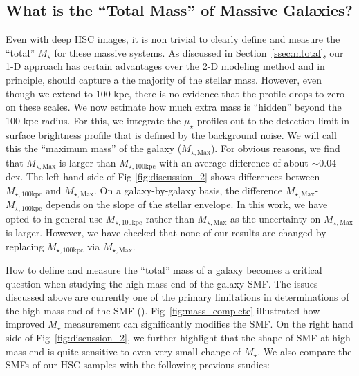 \documentclass[a4paper,fleqn,usenatbib]{mnras}
\def\mstar{{$M_{\star}$}}
\def\mtot{{$M_{\star,100\mathrm{kpc}}$}}
\def\mmax{{$M_{\star,\mathrm{Max}}$}}
\def\mden{{$\mu_{\star}$}}
\begin{document}
\subsection{What is the ``Total Mass'' of Massive Galaxies?}

    Even with deep HSC images, it is non trivial to clearly define and measure the
    ``total'' \mstar{} for these massive systems. 
    As discussed in Section~\ref{ssec:mtotal}, our 1-D approach has certain advantages 
    over the 2-D modeling method and in principle, should capture a the majority of 
    the stellar mass. 
    However, even though we extend to 100 kpc, there is no evidence that the profile 
    drops to zero on these scales. 
    We now estimate how much extra mass is ``hidden'' beyond the 100 kpc radius. 
    For this, we integrate the \mden{} profiles out to the detection limit in 
    surface brightness profile that is defined by the background noise.
    We will call this the ``maximum mass'' of the galaxy (\mmax{}). 
    For obvious reasons, we find that \mmax{} is larger than \mtot{} with an average 
    difference of about ${\sim}0.04$ dex. 
    The left hand side of Fig \ref{fig:discussion_2} shows differences between \mtot{}
    and \mmax{}. 
    On a galaxy-by-galaxy basis, the difference \mmax{}-\mtot{} depends on the slope 
    of the stellar envelope. 
    In this work, we have opted to in general use \mtot{} rather than \mmax{} as the 
    uncertainty on \mmax{} is larger. 
    However, we have checked that none of our results are changed by replacing \mtot{} 
    via \mmax{}.
        
    How to define and measure the ``total'' mass of a galaxy becomes a critical 
    question when studying the high-mass end of the galaxy SMF. 
    The issues discussed above are currently one of the primary limitations in 
    determinations of the high-mass end of the SMF (\citealt{Bernardi2016}). 
    Fig~\ref{fig:mass_complete} illustrated how improved \mstar{} measurement can 
    significantly modifies the SMF. 
    On the right hand side of Fig~\ref{fig:discussion_2}, we further highlight that 
    the shape of SMF at high-mass end is quite sensitive to even very small 
    change of \mstar{}. 
    We also compare the SMFs of our HSC samples with the following previous studies:
        
\end{document}
